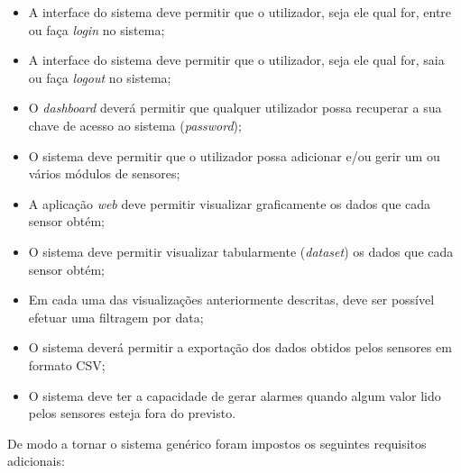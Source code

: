 \begin{itemize}
	\item A interface do sistema deve permitir que o utilizador, seja ele qual for, entre ou faça \textit{login} no sistema;
	
	\item A interface do sistema deve permitir que o utilizador, seja ele qual for, saia ou faça \textit{logout} no sistema;
	
	\item O \textit{dashboard} deverá permitir que qualquer utilizador possa recuperar a sua chave de acesso ao sistema (\textit{password});
	
	\item O sistema deve permitir que o utilizador possa adicionar e/ou gerir um ou vários módulos de sensores; 
	
	\item A aplicação \textit{web} deve permitir visualizar graficamente os dados que cada sensor obtém; 
	
	\item O sistema deve permitir visualizar tabularmente (\textit{dataset}) os dados que cada sensor obtém;  
	
	\item Em cada uma das visualizações anteriormente descritas, deve ser possível efetuar uma filtragem por data;
	
	\item O sistema deverá permitir a exportação dos dados obtidos pelos sensores  em formato \ac{CSV}; 
	
	\item O sistema deve ter a capacidade de gerar alarmes quando algum valor lido pelos sensores esteja fora do previsto.
	
\end{itemize}


De modo a tornar o sistema genérico foram impostos os seguintes requisitos adicionais: 


